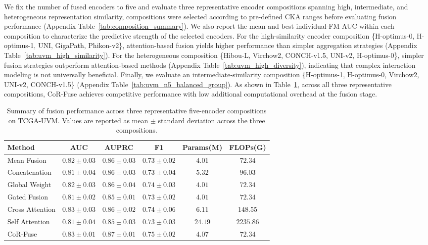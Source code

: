We fix the number of fused encoders to five and evaluate three representative encoder compositions spanning high, intermediate, and heterogeneous representation similarity, compositions were selected according to pre-defined CKA ranges before evaluating fusion performance (Appendix Table~\ref{tab:composition_summary}).
We also report the mean and best individual-FM AUC within each composition to characterize the predictive strength of the selected encoders.
For the high-similarity encoder composition \{H-optimus-0, H-optimus-1, UNI, GigaPath, Phikon-v2\}, attention-based fusion yields higher performance than simpler aggregation strategies (Appendix Table~\ref{tab:uvm_high_similarity}).
For the heterogeneous composition \{Hibou-L, Virchow2, CONCH-v1.5, UNI-v2, H-optimus-0\}, simpler fusion strategies outperform attention-based methods (Appendix Table~\ref{tab:uvm_high_diversity}), indicating that complex interaction modeling is not universally beneficial.
Finally, we evaluate an intermediate-similarity composition \{H-optimus-1, H-optimus-0, Virchow2, UNI-v2, CONCH-v1.5\} (Appendix Table~\ref{tab:uvm_n5_balanced_group}). As shown in Table~\ref{tab:uvm_composition_summary}, across all three representative compositions, CoR-Fuse achieves competitive performance with low additional computational overhead at the fusion stage.

\begin{table}[htbp]
\centering
\caption{Summary of fusion performance across three representative five-encoder compositions on TCGA-UVM.
Values are reported as mean $\pm$ standard deviation across the three compositions.}
\label{tab:uvm_composition_summary}
\begin{tabular}{lccccc}
\toprule
Method & AUC & AUPRC & F1 & Params(M) & FLOPs(G)\\
\midrule
Mean Fusion & $0.82 \pm 0.03$ & $0.86 \pm 0.03$ & $0.73 \pm 0.02$ &$4.01$ &$72.34$\\
Concatenation & $0.81 \pm 0.04$ & $0.86 \pm 0.03$ & $0.73 \pm 0.04$ &$5.32$ &$96.03$\\
Global Weight & $0.82 \pm 0.03$ & $0.86 \pm 0.04$ & $0.74 \pm 0.03$ &$4.01$ &$72.34$\\
Gated Fusion & $0.81 \pm 0.02$ & $0.85 \pm 0.01$ & $0.73 \pm 0.02$ &$4.01$ &$72.34$\\
Cross Attention & $0.83 \pm 0.03$ & $0.86 \pm 0.02$ & $0.74 \pm 0.06$ &$6.11$ &$148.55$\\
Self Attention & $0.81 \pm 0.04$ & $0.85 \pm 0.03$ & $0.73 \pm 0.03$ &$24.19$ &$2235.86$\\
CoR-Fuse & $\mathbf{0.83 \pm 0.01}$ & $\mathbf{0.87 \pm 0.01}$ & $\mathbf{0.75 \pm 0.02}$ &$4.07$ &$72.34$\\
\bottomrule
\end{tabular}
\end{table}

